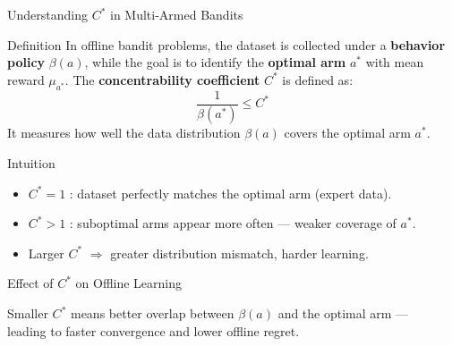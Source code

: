 \documentclass[aspectratio=169]{beamer}
\begin{document}
\begin{frame}{Understanding $C^*$ in Multi-Armed Bandits}

\begin{block}{Definition}
In offline bandit problems, the dataset is collected under a \textbf{behavior policy} $\beta(a)$,
while the goal is to identify the \textbf{optimal arm} $a^*$ with mean reward $\mu_{a^*}$.
The \textbf{concentrability coefficient} $C^*$ is defined as:
\[
\frac{1}{\beta(a^*)} \le C^*
\]
It measures how well the data distribution $\beta(a)$ covers the optimal arm $a^*$.
\end{block}

\pause
\begin{block}{Intuition}
\begin{itemize}
    \item $C^* = 1$ : dataset perfectly matches the optimal arm (expert data).
    \item $C^* > 1$ : suboptimal arms appear more often — weaker coverage of $a^*$.
    \item Larger $C^*$ $\Rightarrow$ greater distribution mismatch, harder learning.
\end{itemize}
\end{block}

\end{frame}

\begin{frame}{Effect of $C^*$ on Offline Learning}

\centering
{}

\vspace{1em}
\pause
\textcolor{gray!70}{Smaller $C^*$ means better overlap between $\beta(a)$ and the optimal arm —} \\
\textcolor{gray!70}{leading to faster convergence and lower offline regret.}
\end{frame}
\end{document}
